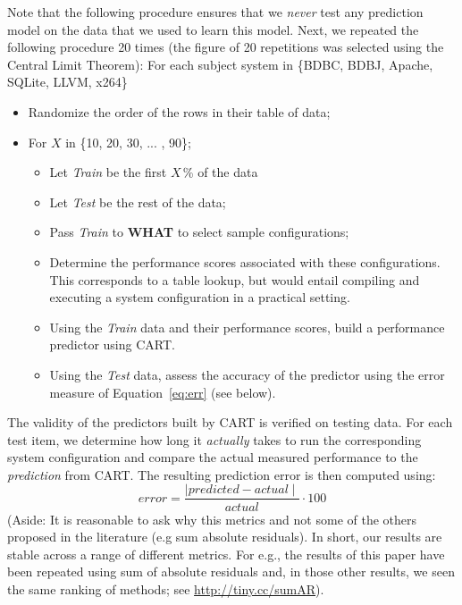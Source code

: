 \documentclass[smallextended]{svjour3}       %
\newcommand{\eq}[1]{Equation~\ref{eq:#1}}
\newcommand{\what}{{\bf WHAT}\xspace}
\begin{document}
Note that the following procedure ensures that
we \textit{never} test any prediction model on the data that we used to learn this model. Next, we repeated the following procedure 20 times (the figure of 20 repetitions was
selected using the Central Limit Theorem): 
For each subject system in \{BDBC, BDBJ, Apache, SQLite, LLVM, x264\}
\begin{itemize}
\item Randomize the order of the rows in their table of data;
\item For $X$ in \{10, 20, 30, ... , 90\};
\begin{itemize}
\item Let {\em Train} be the first $X$\,\% of the data 
\item Let {\em Test} be the rest of the data;
\item Pass {\em Train} to \what to select   sample   configurations;
\item Determine the performance scores associated with these configurations. This corresponds to a table lookup, but would entail compiling and executing a system configuration in a practical setting.
\item Using the {\em Train}  data and their performance scores, build a performance predictor using CART.
\item Using the {\em Test} data, assess the accuracy of the predictor using the error 
measure of \eq{err} (see below).
\end{itemize}
\end{itemize}


The validity of the predictors built by CART is verified on testing data. 
For each  test item, we determine how long it {\em actually} takes to run the corresponding system configuration and compare the actual measured performance to the {\em prediction} from CART. The resulting prediction error is then computed using:
\begin{equation}\label{eq:err}
\mathit{error}=\frac{\mid\mathit{predicted} - \mathit{actual}\mid}{\mathit{actual}} \cdot 100
\end{equation}
(Aside: It is reasonable to ask why this metrics and not some of the others proposed
in the literature (e.g sum absolute residuals). In short, our results are stable
across a range of different metrics. For e.g., the results of this paper have
been repeated using sum of absolute residuals and, in those other results,
we seen the same ranking of methods; see  \url{http://tiny.cc/sumAR}).
\end{document}
